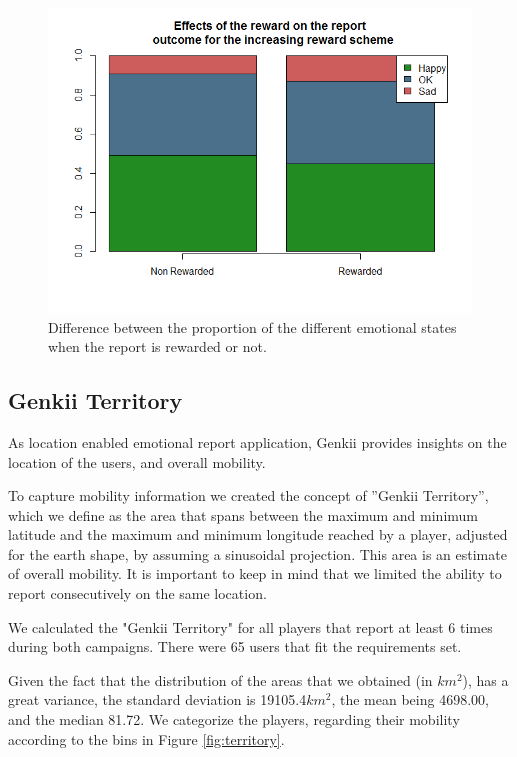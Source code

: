 \documentclass[letterpaper]{article}
\begin{document}
\begin{figure}[htb]
	\begin{center}
		\includegraphics[width=1\linewidth]{images/RewardsIncreasing}
		\caption{Difference between the proportion of  the different emotional states when the report is rewarded or not.\label{fig:RewardedsIncreasing}}
	\end{center}
\end{figure}




\subsection{Genkii Territory}

As location enabled emotional report application, Genkii provides insights on the location of the users, and overall mobility.

To capture mobility information we created the concept of ''Genkii Territory'', which we define as the area that spans between the maximum and minimum latitude and the maximum and minimum longitude reached by a player, adjusted for the earth shape, by assuming a sinusoidal projection. This area is an estimate of overall mobility.
It is important to keep in mind that we limited the ability to report consecutively on the same location.

We calculated the "Genkii Territory" for all players that report at least 6 times during both campaigns. There were 65 users that fit the requirements set.

Given the fact that the distribution of the areas that we obtained (in $km^2$),
has a great variance, the standard deviation is 19105.4$km^2$, the mean being 4698.00, and the median 81.72. We categorize the players, regarding their mobility according to the bins in Figure \ref{fig:territory}.
\end{document}

